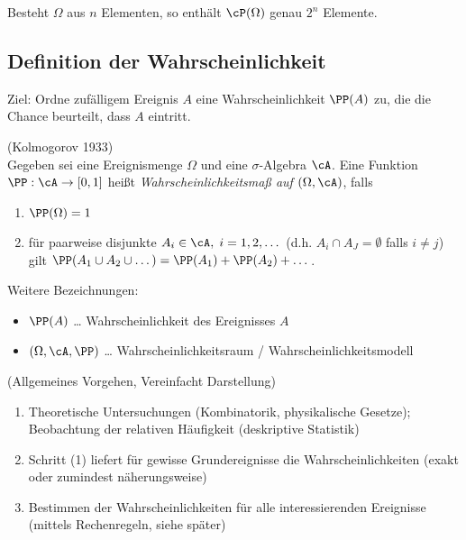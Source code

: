 \documentclass{scrreprt}
\begin{document}
 Besteht $\Omega$ aus $n$ Elementen, so enthält $\cP(\Omega)$ genau $2^n$ Elemente.

\subsection{Definition der Wahrscheinlichkeit}

Ziel: Ordne zufälligem Ereignis $A$ eine Wahrscheinlichkeit $\PP(A)$ zu, die die Chance beurteilt, dass $A$ eintritt.

 (Kolmogorov 1933)\\
Gegeben sei eine Ereignismenge $\Omega$ und eine $\sigma$-Algebra $\cA$. Eine Funktion $\PP : \cA \to [0,1]$ heißt \emph{Wahrscheinlichkeitsmaß auf $(\Omega,\cA)$}, falls
\begin{enumerate}
\item $\PP (\Omega) =1$
\item für paarweise disjunkte $A_i \in \cA, \; i=1,2,\dots$ (d.h. $A_i \cap A_J = \emptyset$ falls $i \not = j$) gilt $\PP(A_1 \cup A_2 \cup \dots ) = \PP(A_1)+\PP(A_2)+\dots$.
\end{enumerate}
Weitere Bezeichnungen:
\begin{itemize}
\item $\PP(A)$ … Wahrscheinlichkeit des Ereignisses $A$
\item $(\Omega,\cA, \PP)$ … Wahrscheinlichkeitsraum / Wahrscheinlichkeitsmodell
\end{itemize}

 (Allgemeines Vorgehen, Vereinfacht Darstellung)
\begin{enumerate}
\item Theoretische Untersuchungen (Kombinatorik, physikalische Gesetze); Beobachtung der relativen Häufigkeit (deskriptive Statistik)
\item Schritt (1) liefert für gewisse Grundereignisse die Wahrscheinlichkeiten (exakt oder zumindest näherungsweise)
\item Bestimmen der Wahrscheinlichkeiten für alle interessierenden Ereignisse (mittels Rechenregeln, siehe später)
\end{enumerate}
\end{document}
